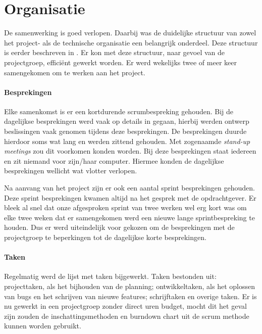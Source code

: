 \section{Organisatie}
De samenwerking is goed verlopen. Daarbij was de duidelijke structuur van zowel het project- als de technische organisatie een belangrijk onderdeel. Deze structuur is eerder beschreven in . Er kon met deze structuur, naar gevoel van de projectgroep, efficiënt gewerkt worden. Er werd wekelijks twee of meer keer samengekomen om te werken aan het project.

\paragraph{Besprekingen} Elke samenkomst is er een kortdurende scrumbespreking gehouden. Bij de dagelijkse besprekingen werd vaak op details in gegaan, hierbij werden ontwerp beslissingen vaak genomen tijdens deze besprekingen. De besprekingen duurde hierdoor soms wat lang en werden zittend gehouden. Met zogenaamde \emph{stand-up meetings} zou dit voorkomen konden worden. Bij deze besprekingen staat iedereen en zit niemand voor zijn/haar computer. Hiermee konden de dagelijkse besprekingen wellicht wat vlotter verlopen.


Na aanvang van het project zijn er ook een aantal sprint besprekingen gehouden. Deze sprint besprekingen kwamen altijd na het gesprek met de opdrachtgever. Er bleek al snel dat onze afgesproken sprint van twee werken wel erg kort was om elke twee weken dat er samengekomen werd een nieuwe lange sprintbespreking te houden. Dus er werd uiteindelijk voor gekozen om de besprekingen met de projectgroep te beperkingen tot de dagelijkse korte besprekingen.


\paragraph{Taken}
Regelmatig werd de lijst met taken bijgewerkt. Taken bestonden uit: projecttaken, als het bijhouden van de planning; ontwikkeltaken, als het oplossen van bugs en het schrijven van nieuwe features; schrijftaken en overige taken. 
Er is nu gewerkt in een projectgroep zonder direct uren budget, mocht dit het geval zijn zouden de inschattingsmethoden en burndown chart uit de scrum methode kunnen worden gebruikt. 

